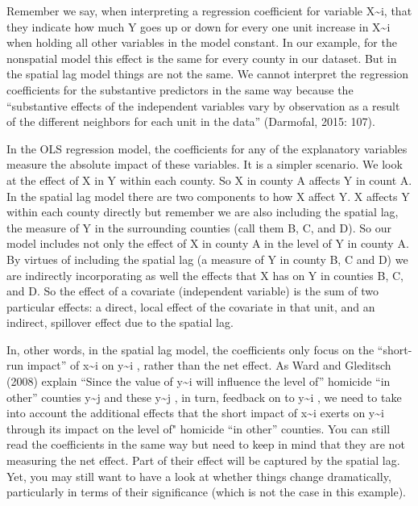 \documentclass[]{book}
\begin{document}
Remember we say, when interpreting a regression coefficient for variable X\textasciitilde{}i, that they indicate how much Y goes up or down for every one unit increase in X\textasciitilde{}i when holding all other variables in the model constant. In our example, for the nonspatial model this effect is the same for every county in our dataset. But in the spatial lag model things are not the same. We cannot interpret the regression coefficients for the substantive predictors in the same way because the ``substantive effects of the independent variables vary by observation as a result of the different neighbors for each unit in the data'' (Darmofal, 2015: 107).

In the OLS regression model, the coefficients for any of the explanatory variables measure the absolute impact of these variables. It is a simpler scenario. We look at the effect of X in Y within each county. So X in county A affects Y in count A. In the spatial lag model there are two components to how X affect Y. X affects Y within each county directly but remember we are also including the spatial lag, the measure of Y in the surrounding counties (call them B, C, and D). So our model includes not only the effect of X in county A in the level of Y in county A. By virtues of including the spatial lag (a measure of Y in county B, C and D) we are indirectly incorporating as well the effects that X has on Y in counties B, C, and D. So the effect of a covariate (independent variable) is the sum of two particular effects: a direct, local effect of the covariate in that unit, and an indirect, spillover effect due to the spatial lag.

In, other words, in the spatial lag model, the coefficients only focus on the ``short-run impact'' of x\textasciitilde{}i on y\textasciitilde{}i , rather than the net effect. As Ward and Gleditsch (2008) explain ``Since the value of y\textasciitilde{}i will influence the level of'' homicide ``in other'' counties y\textasciitilde{}j and these y\textasciitilde{}j , in turn, feedback on to y\textasciitilde{}i , we need to take into account the additional effects that the short impact of x\textasciitilde{}i exerts on y\textasciitilde{}i through its impact on the level of" homicide ``in other'' counties. You can still read the coefficients in the same way but need to keep in mind that they are not measuring the net effect. Part of their effect will be captured by the spatial lag. Yet, you may still want to have a look at whether things change dramatically, particularly in terms of their significance (which is not the case in this example).
\end{document}
